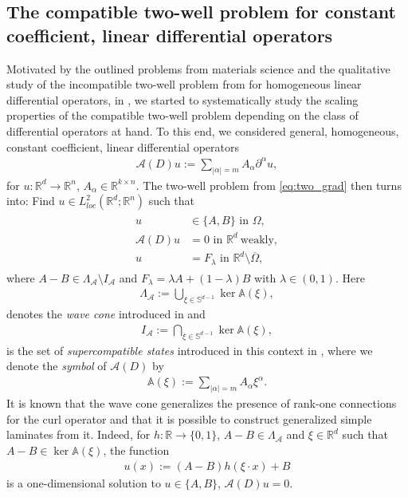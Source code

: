 \documentclass[a4paper, 10pt, twoside, notitlepage]{amsart}
\theoremstyle{plain}
\newcommand{\R}{\mathbb{R}}
\newcommand{\A}{\mathcal{A}}
\renewcommand{\AA}{\mathbb{A}}
\begin{document}
	
	\subsection{The compatible two-well problem for constant coefficient, linear differential operators}
	Motivated by the outlined problems from materials science and the qualitative study of the incompatible two-well problem from \cite{DPPR18} for homogeneous linear differential operators,
	in \cite{RRT22}, we started to systematically study the scaling properties of the compatible two-well problem depending on the class of differential operators at
	hand. To this end, we considered general, homogeneous, constant coefficient, linear differential operators
	\begin{align*}
		\A(D)u:= \sum\limits_{|\alpha|=m} A_{\alpha} \partial^\alpha u,
	\end{align*}
	for $u: \R^d \rightarrow \R^n$, $A_{\alpha} \in \R^{k \times n}$.  The two-well problem from \eqref{eq:two_grad} then turns into:  Find $u \in
		L^2_{loc}(\R^d;\R^n)$ such that
	\begin{align}
		\label{eq:two_well_gen}
		\begin{split}
			u& \in \{A,B\} \mbox{ in } \Omega,\\
			\A(D) u &= 0 \mbox{ in } \R^d \ \text{weakly},\\
			u& = F_{\lambda} \mbox{ in } \R^d \setminus \overline{\Omega},
		\end{split}
	\end{align}
	where $A-B \in \Lambda_{\A} \setminus I_{\A}$ and $F_{\lambda} = \lambda A + (1-\lambda) B$ with $\lambda \in (0,1)$. Here
	\begin{align} \label{eq:wave_cone}
		\Lambda_{\A}:= \bigcup\limits_{\xi \in \mathbb{S}^{d-1}}\ker \AA(\xi),
	\end{align}
	denotes the \emph{wave cone} introduced in \cite{T79,Mur81} and
	\begin{align} \label{eq:super_compatible}
		I_{\A}:= \bigcap\limits_{\xi \in \mathbb{S}^{d-1}} \ker \AA(\xi),
	\end{align}
	is the set of \emph{supercompatible states} introduced in this context in \cite{RRT22}, where we denote the \emph{symbol} of $\A(D)$ by
		\begin{align} \label{eq:symbol}
			\AA(\xi) := \sum_{|\alpha|=m} A_\alpha \xi^\alpha.
                \end{align}
              It is known that the wave cone generalizes the presence of rank-one connections for the curl operator and that it is possible to construct generalized simple laminates from it.
              Indeed, for $h:\R \to \{0,1\}$, $A-B \in \Lambda_{\A}$ and $\xi \in \R^d$ such that $A-B\in \ker \AA(\xi)$, the function
	\begin{align*}
		u(x):= (A-B) h(\xi \cdot x) + B
	\end{align*}
	is a one-dimensional solution to $u \in \{A,B\}$, $\A(D) u = 0$.
	
\end{document}

